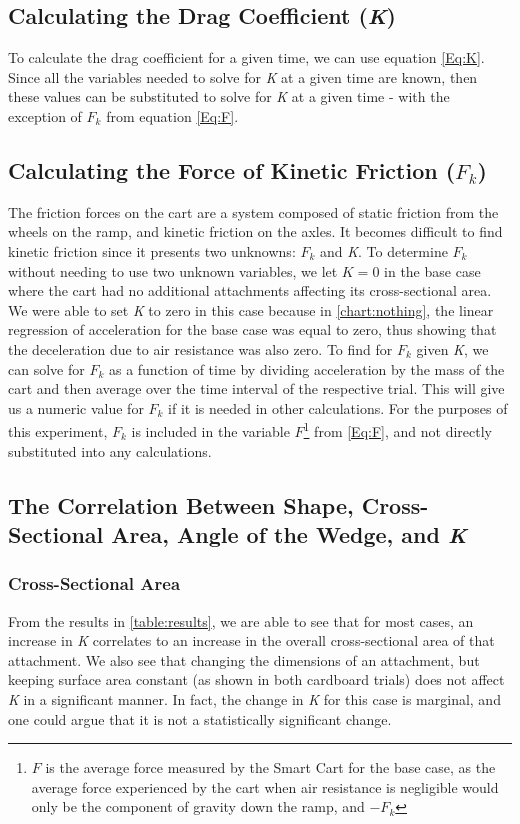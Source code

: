 \subsection{Calculating the Drag Coefficient (\textit{K})}
To calculate the drag coefficient for a given time, we can use equation \ref{Eq:K}.
Since all the variables needed to solve for \textit{K} at a given time are known, then 
these values can be substituted to solve for \textit{K} at a given time - with the exception of $F_{k}$ from
equation \ref{Eq:F}. 

\subsection{Calculating the Force of Kinetic Friction ($F_{k}$)}
The friction forces on the cart are a system
composed of static friction from the wheels on the ramp, and kinetic friction on the axles. It
becomes difficult to find kinetic friction since it presents two unknowns: $F_{k}$ and \textit{K}.
To determine $F_{k}$ without needing to use two unknown variables, we let $K = 0$ in the base case
where the cart had no additional attachments affecting its cross-sectional area. We were able to set \textit{K}
to zero in this case because in \ref{chart:nothing}, the linear regression of acceleration for the base case was equal to zero, thus showing
that the deceleration due to air resistance was also zero. To find for $F_{k}$ given \textit{K}, we can solve
for $F_{k}$ as a function of time by dividing acceleration by the mass of the cart and then average over the time interval
of the respective trial. This will give us a numeric value for $F_{k}$ if it is needed in other calculations.
For the purposes of this experiment, $F_{k}$ is included in the variable $F$\footnote{$F$ is the average force measured by the Smart Cart for the base case, as the average
force experienced by the cart when air resistance is negligible would only be the component of gravity down the ramp, and $-F_{k}$} from \ref{Eq:F}, and not directly
substituted into any calculations.

\subsection{The Correlation Between Shape, Cross-Sectional Area, Angle of the Wedge, and \textit{K}}

\subsubsection{Cross-Sectional Area}
From the results in \ref{table:results}, we are able to see that for most cases, an increase in \textit{K}
correlates to an increase in the overall cross-sectional area of that attachment. We also see that changing the dimensions
of an attachment, but keeping surface area constant (as shown in both cardboard trials) does not affect \textit{K} in a
significant manner. In fact, the change in \textit{K} for this case is marginal, and one could argue that it is not a statistically significant
change.

